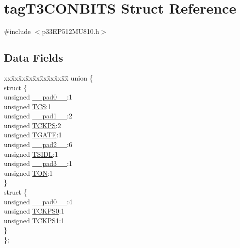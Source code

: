 \hypertarget{structtag_t3_c_o_n_b_i_t_s}{}\section{tag\+T3\+C\+O\+N\+B\+I\+TS Struct Reference}
\label{structtag_t3_c_o_n_b_i_t_s}


{\ttfamily \#include $<$p33\+E\+P512\+M\+U810.\+h$>$}

\subsection*{Data Fields}
\begin{DoxyCompactItemize}
\item 
\begin{tabbing}
xx\=xx\=xx\=xx\=xx\=xx\=xx\=xx\=xx\=\kill
union \{\\
\>struct \{\\
\>\>unsigned \hyperlink{structtag_t3_c_o_n_b_i_t_s_adf71f3d8410c1f1dbbc96680a92c49af}{\_\_pad0\_\_}:1\\
\>\>unsigned \hyperlink{structtag_t3_c_o_n_b_i_t_s_ab4daee3a10870ffba1c86d5020adb9b4}{TCS}:1\\
\>\>unsigned \hyperlink{structtag_t3_c_o_n_b_i_t_s_acaf2d0924a107ec6e8d2e31febaf66f9}{\_\_pad1\_\_}:2\\
\>\>unsigned \hyperlink{structtag_t3_c_o_n_b_i_t_s_a0d455d68434019feaabe9dfb64d75552}{TCKPS}:2\\
\>\>unsigned \hyperlink{structtag_t3_c_o_n_b_i_t_s_a35b6e4b591a8bd20e026168399eb0e6a}{TGATE}:1\\
\>\>unsigned \hyperlink{structtag_t3_c_o_n_b_i_t_s_a4d97cc5f7d51d22fc2bf3eab35c9cb7f}{\_\_pad2\_\_}:6\\
\>\>unsigned \hyperlink{structtag_t3_c_o_n_b_i_t_s_a4971b881615ef42703b5b78179fcda3d}{TSIDL}:1\\
\>\>unsigned \hyperlink{structtag_t3_c_o_n_b_i_t_s_ad7d7cee33e0c7f447abc4d171c628dd4}{\_\_pad3\_\_}:1\\
\>\>unsigned \hyperlink{structtag_t3_c_o_n_b_i_t_s_a8c2a094047d1019ce1c5b25ea8cff9b3}{TON}:1\\
\>\} \\
\>struct \{\\
\>\>unsigned \hyperlink{structtag_t3_c_o_n_b_i_t_s_adf71f3d8410c1f1dbbc96680a92c49af}{\_\_pad0\_\_}:4\\
\>\>unsigned \hyperlink{structtag_t3_c_o_n_b_i_t_s_a5cd4ef74604f5d88289a53f41cf38b7e}{TCKPS0}:1\\
\>\>unsigned \hyperlink{structtag_t3_c_o_n_b_i_t_s_ae190f2375c403c9fe8f5eb62a5bdf200}{TCKPS1}:1\\
\>\} \\
\}; \\

\end{tabbing}\end{DoxyCompactItemize}


